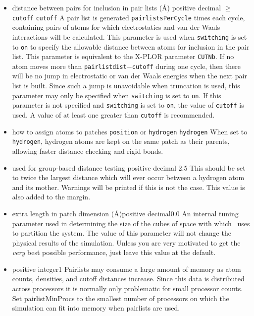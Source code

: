 \begin{itemize}
\item
{}
{distance between pairs for inclusion in pair lists (\AA)}
{positive decimal $\geq$ {\tt cutoff}}
{{\tt cutoff}}
{
A pair list is generated {\tt pairlistsPerCycle} times each cycle, 
containing pairs of atoms for which 
electrostatics and van der Waals interactions will be calculated.
This parameter is used when {\tt switching} is set to {\tt on} to
specify the allowable distance between atoms for inclusion in the
pair list.  
This parameter is equivalent to the X-PLOR parameter {\tt CUTNb}.
If no atom moves more than {\tt pairlistdist}$-${\tt cutoff} during
one cycle, then there will be no jump in electrostatic or van der
Waals energies when the next pair list is built.  Since such a jump
is unavoidable when truncation is used, this parameter may only
be specified when {\tt switching} is set to {\tt on}.  If this
parameter is not specified and {\tt switching} is set to {\tt on},
the value of {\tt cutoff} is used.  
A value of at least one greater than {\tt cutoff} is recommended.  
}

\item
{}
{how to assign atoms to patches}
{{\tt position} or {\tt hydrogen}}
{{\tt hydrogen}}
{
When set to {\tt hydrogen}, hydrogen atoms are kept on the same patch as their parents, allowing faster distance checking and rigid bonds.
}

\item
{}
{used for group-based distance testing}
{positive decimal}
{2.5}
{
This should be set to twice the largest distance which will ever occur between a hydrogen atom and its mother.  Warnings will be printed if this is not the case.  This value is also added to the margin.
}

\item
{}
{extra length in patch dimension (\AA)}{positive decimal}{0.0}
{An internal tuning parameter used in determining the size of the cubes 
of space with which \NAMD\ uses to partition the system.  The value of 
this parameter will not change the physical results of the simulation.  
Unless you are very motivated to get the {\it very} best 
possible performance, just leave this value at the default.}

\item
{}
{positive integer}{1}
{
Pairlists may consume a large amount of memory as atom counts, densities,
and cutoff distances increase.  Since this data is distributed across
processors it is normally only problematic for small processor counts.
Set pairlistMinProcs to the smallest number of processors on which
the simulation can fit into memory when pairlists are used.
}


\end{itemize}
